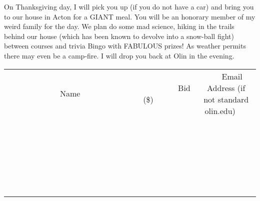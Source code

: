 \documentclass[11pt]{article}
\begin{document}
On Thanksgiving day, I will pick you up (if you do not have a car) and bring you to our house in Acton for a GIANT meal. You will be an honorary member of my weird family for the day. We plan do some mad science, hiking in the trails behind our house (which has been known to devolve into a snow-ball fight) between courses and trivia Bingo with FABULOUS prizes!  As weather permits there may even be a camp-fire. I will drop you back at Olin in the evening.
\\[6ex]
\begin{tabular}{c c c}
~~~~~~~~~~~~~Name~~~~~~~~~~~~~ & ~~~~~~~~~Bid (\$)~~~~~~~~~  & ~~~Email Address (if not standard olin.edu)~~~\\
 & & \\
\hline
 & & \\
\hline
 & & \\
\hline
 & & \\
\hline
 & & \\
\hline
 & & \\
\hline
 & & \\
\hline
 & & \\
\hline
 & & \\
\hline
 & & \\
\hline
 & & \\
\hline
 & & \\
\hline
 & & \\
\hline
 & & \\
\hline
 & & \\
\hline
 & & \\
\hline
 & & \\
\hline
 & & \\
\hline
 & & \\
\hline
 & & \\
\hline
 & & \\
\hline
 & & \\
\hline
 & & \\
\hline
 & & \\
\hline
 & & \\
\hline
 & & \\
\hline
\end{tabular}
\newpage
\end{document}

